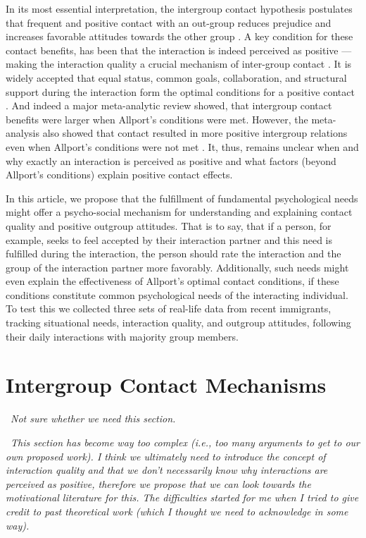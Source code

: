 \documentclass[man, 12pt, a4paper]{apa7}
\theoremstyle{break}
\theoremstyle{plain}
\begin{document}
In its most essential interpretation, the intergroup contact hypothesis postulates that frequent and positive contact with an out-group reduces prejudice and increases favorable attitudes towards the other group \citep[e.g.,][]{Hewstone1996, Pettigrew1998}. A key condition for these contact benefits, has been that the interaction is indeed perceived as positive --- making the interaction quality a crucial mechanism of inter-group contact \citep[e.g.,][]{MacInnis2015}. It is widely accepted that equal status, common goals, collaboration, and structural support during the interaction form the optimal conditions for a positive contact \citep[Allport's Optimal Contact conditions,][]{Allport1954b, Pettigrew1969}. And indeed a major meta-analytic review showed, that intergroup contact benefits were larger when Allport's conditions were met. However, the meta-analysis also showed that contact resulted in more positive intergroup relations even when Allport's conditions were not met \citep[][]{Pettigrew2006}. It, thus, remains unclear when and why exactly an interaction is perceived as positive and what factors (beyond Allport's conditions) explain positive contact effects.

In this article, we propose that the fulfillment of fundamental psychological needs might offer a psycho-social mechanism for understanding and explaining contact quality and positive outgroup attitudes. That is to say, that if a person, for example, seeks to feel accepted by their interaction partner and this need is fulfilled during the interaction, the person should rate the interaction and the group of the interaction partner more favorably. Additionally, such needs might even explain the effectiveness of Allport's optimal contact conditions, if these conditions constitute common psychological needs of the interacting individual. To test this we collected three sets of real-life data from recent immigrants, tracking situational needs, interaction quality, and outgroup attitudes, following their daily interactions with majority group members. 

\section{Intergroup Contact Mechanisms}
\faQuestionCircle\ \textit{Not sure whether we need this section.}

\faExclamationCircle\ \textit{This section has become way too complex (i.e., too many arguments to get to our own proposed work). I think we ultimately need to introduce the concept of interaction quality and that we don't necessarily know why interactions are perceived as positive, therefore we propose that we can look towards the motivational literature for this. The difficulties started for me when I tried to give credit to past theoretical work (which I thought we need to acknowledge in some way).}
\end{document}
